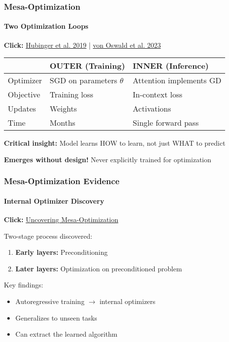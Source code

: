 \documentclass[10pt,aspectratio=169]{beamer}
\begin{document}
\begin{frame}
\frametitle{Mesa-Optimization}
\framesubtitle{Two Optimization Loops}

\begin{center}
\Large
\textbf{Click:} \href{run:./papers/1906.01820_risks_learned_optimization.pdf}{\color{blue}Hubinger et al. 2019} | 
\href{run:./papers/2309.05858_mesa_optimization.pdf}{\color{blue}von Oswald et al. 2023}
\end{center}

\vspace{0.5cm}

\begin{center}
\begin{tabular}{|l|l|l|}
\hline
& \textbf{OUTER (Training)} & \textbf{INNER (Inference)} \\
\hline
Optimizer & SGD on parameters $\theta$ & Attention implements GD \\
\hline
Objective & Training loss & In-context loss \\
\hline
Updates & Weights & Activations \\
\hline
Time & Months & Single forward pass \\
\hline
\end{tabular}
\end{center}

\vspace{0.5cm}
\textbf{Critical insight:} Model learns HOW to learn, not just WHAT to predict

\vspace{0.3cm}
\textbf{Emerges without design!} Never explicitly trained for optimization
\end{frame}

\begin{frame}
\frametitle{Mesa-Optimization Evidence}
\framesubtitle{Internal Optimizer Discovery}

\begin{center}
\Large
\textbf{Click:} \href{run:./papers/2309.05858_mesa_optimization.pdf}{\color{blue}Uncovering Mesa-Optimization}
\end{center}

\vspace{0.5cm}

Two-stage process discovered:
\begin{enumerate}
    \item \textbf{Early layers:} Preconditioning
    \item \textbf{Later layers:} Optimization on preconditioned problem
\end{enumerate}

\vspace{0.5cm}
Key findings:
\begin{itemize}
    \item Autoregressive training $\rightarrow$ internal optimizers
    \item Generalizes to unseen tasks
    \item Can extract the learned algorithm
\end{itemize}
\end{frame}
\end{document}
